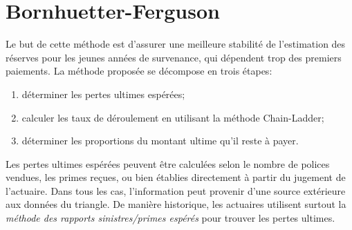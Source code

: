 \section{Bornhuetter-Ferguson}
\label{sec:deterministe:BF}

Le but de cette méthode est d'assurer une meilleure stabilité de
l'estimation des réserves pour les jeunes années de survenance, qui
dépendent trop des premiers paiements. La méthode proposée se
décompose en trois étapes:
\begin{enumerate}
\item déterminer les pertes ultimes espérées;
\item calculer les taux de déroulement en utilisant la méthode
  Chain-Ladder;
\item déterminer les proportions du montant ultime qu'il reste à
  payer.
\end{enumerate}
Les pertes ultimes espérées peuvent être calculées selon le nombre de
polices vendues, les primes reçues, ou bien établies directement à
partir du jugement de l'actuaire. Dans tous les cas, l'information
peut provenir d'une source extérieure aux données du triangle. De
manière historique, les actuaires utilisent surtout la \textit{méthode
  des rapports sinistres/primes espérés} pour trouver les pertes
ultimes.

